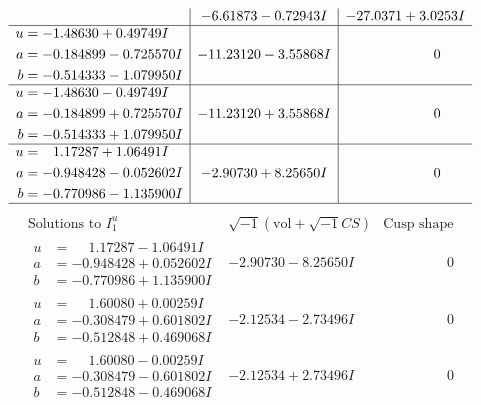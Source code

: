\documentclass[1p]{elsarticle_modified}
\theoremstyle{definition}
\newcommand{\I}{\sqrt{-1}}
\begin{document}
$$\begin{array}{c|c|c}
 & -6.61873 - 0.72943 I & -27.0371 + 3.0253 I \\ \hline\begin{aligned}
u &= -1.48630 + 0.49749 I \\
a &= -0.184899 - 0.725570 I \\
b &= -0.514333 - 1.079950 I\end{aligned}
 & -11.23120 - 3.55868 I & \phantom{-0.000000 } 0 \\ \hline\begin{aligned}
u &= -1.48630 - 0.49749 I \\
a &= -0.184899 + 0.725570 I \\
b &= -0.514333 + 1.079950 I\end{aligned}
 & -11.23120 + 3.55868 I & \phantom{-0.000000 } 0 \\ \hline\begin{aligned}
u &= \phantom{-}1.17287 + 1.06491 I \\
a &= -0.948428 - 0.052602 I \\
b &= -0.770986 - 1.135900 I\end{aligned}
 & -2.90730 + 8.25650 I & \phantom{-0.000000 } 0\\
 \hline 
 \end{array}$$\newpage$$\begin{array}{c|c|c}  
\text{Solutions to }I^u_{1}& \I (\text{vol} + \sqrt{-1}CS) & \text{Cusp shape}\\
 \hline 
\begin{aligned}
u &= \phantom{-}1.17287 - 1.06491 I \\
a &= -0.948428 + 0.052602 I \\
b &= -0.770986 + 1.135900 I\end{aligned}
 & -2.90730 - 8.25650 I & \phantom{-0.000000 } 0 \\ \hline\begin{aligned}
u &= \phantom{-}1.60080 + 0.00259 I \\
a &= -0.308479 + 0.601802 I \\
b &= -0.512848 + 0.469068 I\end{aligned}
 & -2.12534 - 2.73496 I & \phantom{-0.000000 } 0 \\ \hline\begin{aligned}
u &= \phantom{-}1.60080 - 0.00259 I \\
a &= -0.308479 - 0.601802 I \\
b &= -0.512848 - 0.469068 I\end{aligned}
 & -2.12534 + 2.73496 I & \phantom{-0.000000 } 0 \\ \hline\begin{aligned}

\end{aligned}
\end{array}$$
\end{document}
